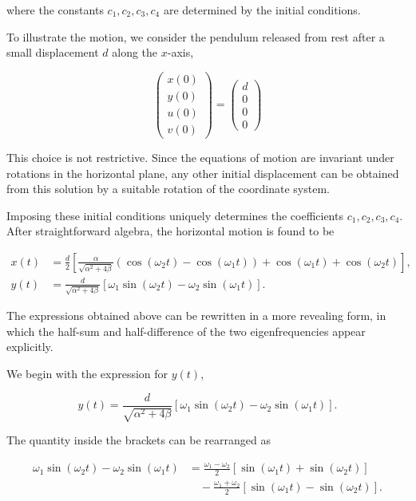 \documentclass[12pt]{article}
\begin{document}
where the constants \(c_1,c_2,c_3,c_4\) are determined by the initial
conditions.

To illustrate the motion, we consider the pendulum released from rest after a
small displacement \(d\) along the \(x\)-axis,

\[
\begin{pmatrix}
x(0)\\
y(0)\\
u(0)\\
v(0)
\end{pmatrix}
=
\begin{pmatrix}
d\\
0\\
0\\
0
\end{pmatrix}
\]

This choice is not restrictive. Since the equations of motion are invariant
under rotations in the horizontal plane, any other initial displacement can be
obtained from this solution by a suitable rotation of the coordinate system.

Imposing these initial conditions uniquely determines the coefficients
\(c_1,c_2,c_3,c_4\). After straightforward algebra, the horizontal motion is
found to be

\begin{align}
x(t)
&=
\frac{d}{2}
\left[
\frac{\alpha}{\sqrt{\alpha^2+4\beta}}
\left(
\cos(\omega_2t)
-
\cos(\omega_1t)
\right)
+
\cos(\omega_1t)
+
\cos(\omega_2t)
\right],
\\[0.8em]
y(t)
&=
\frac{d}{\sqrt{\alpha^2+4\beta}}
\left[
\omega_1\sin(\omega_2t)
-
\omega_2\sin(\omega_1t)
\right].
\end{align}
 
The expressions obtained above can be rewritten in a more revealing form, in
which the half-sum and half-difference of the two eigenfrequencies appear
explicitly.

We begin with the expression for \(y(t)\),

\[
  y(t)
  =
  \frac{d}{\sqrt{\alpha^2+4\beta}}
  \left[
    \omega_1\sin(\omega_2t)
    -
    \omega_2\sin(\omega_1t)
  \right].
\]

The quantity inside the brackets can be rearranged as

\[
  \begin{aligned}
    \omega_1\sin(\omega_2t)
    -
    \omega_2\sin(\omega_1t)
    &=
    \frac{\omega_1-\omega_2}{2}
    \left[
      \sin(\omega_1t)
      +
      \sin(\omega_2t)
    \right]
    \\
    &\quad
    -
    \frac{\omega_1+\omega_2}{2}
    \left[
      \sin(\omega_1t)
      -
      \sin(\omega_2t)
    \right].
  \end{aligned}
\]
\end{document}
